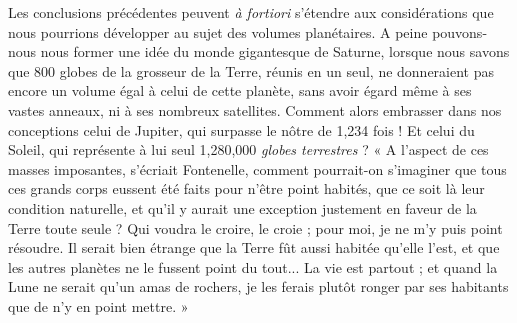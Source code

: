 \documentclass[a4paper, 11pt, oneside, landscape]{article}
\begin{document}
Les conclusions précédentes peuvent \emph{à fortiori} s'étendre aux considérations que nous pourrions développer au sujet des volumes planétaires. A peine pouvons-nous nous former une idée du monde gigantesque de Saturne, lorsque nous savons que 800 globes de la grosseur de la Terre, réunis en un seul, ne donneraient pas encore un volume égal à celui de cette planète, sans avoir égard même à ses vastes anneaux, ni à ses nombreux satellites. Comment alors embrasser dans nos conceptions celui de Jupiter, qui surpasse le nôtre de 1,234 fois ! Et celui du Soleil, qui représente à lui seul 1,280,000 \emph{globes terrestres} ? « A l'aspect de ces masses imposantes, s'écriait Fontenelle, comment pourrait-on s'imaginer que tous ces grands corps eussent été faits pour n'être point habités, que ce soit là leur condition naturelle, et qu'il y aurait une exception justement en faveur de la Terre toute seule ? Qui voudra le croire, le croie ; pour moi, je ne m'y puis point résoudre. Il serait bien étrange que la Terre fût aussi habitée qu'elle l'est, et que les autres planètes ne le fussent point du tout... La vie est partout ; et quand la Lune ne serait qu'un amas de rochers, je les ferais plutôt ronger par ses habitants que de n'y en point mettre. »
\end{document}
